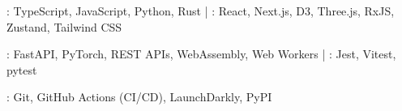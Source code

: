 : TypeScript, JavaScript, Python, Rust | : React, Next.js, D3, Three.js, RxJS, Zustand, Tailwind CSS\par
{}: FastAPI, PyTorch, REST APIs, WebAssembly, Web Workers | : Jest, Vitest, pytest\par
{}: Git, GitHub Actions (CI/CD), LaunchDarkly, PyPI\par
